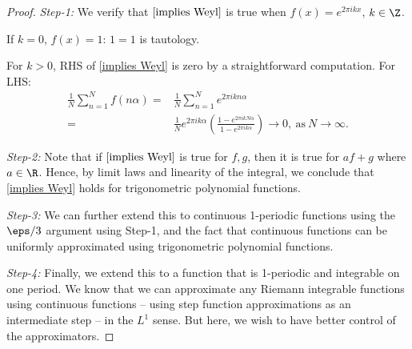 \begin{proof}
    \emph{Step-1:} We verify that \(\cref{implies Weyl}\) is true when \(f(x)=e^{2\pi ikx}\), \(k\in\Z\).

    \medskip

    If \(k=0\), \(f(x)=1\): \(1=1\) is tautology.

    \medskip

    For \(k>0\), RHS of \cref{implies Weyl} is zero by a straightforward computation. For LHS:
    \begin{align*} 
        \frac{1}{N}\sum_{n=1}^N f(n\alpha)=&\frac{1}{N}\sum_{n=1}^N e^{2\pi ikn\alpha}\\
        =&\frac{1}{N}e^{2\pi ik\alpha}\left(\frac{1-e^{2\pi ikN\alpha}}{1-e^{2\pi ik\alpha}}\right)\to 0,~\text{as}~N\to\infty.
    \end{align*}

    \medskip

    \emph{Step-2:} Note that if \(\cref{implies Weyl}\) is true for \(f,g\), then it is true for \(af+g\) where \(a\in\R\). Hence, by limit laws and linearity of the integral, we conclude that \cref{implies Weyl} holds for trigonometric polynomial functions.

    \medskip

    \emph{Step-3:} We can further extend this to continuous 1-periodic functions using the \(\eps/3\) argument using Step-1, and the fact that continuous functions can be uniformly approximated using trigonometric polynomial functions.

    \medskip

    \emph{Step-4:} Finally, we extend this to a function that is 1-periodic and integrable on one period. We know that we can approximate any Riemann integrable functions using continuous functions -- using step function approximations as an intermediate step -- in the \(L^1\) sense. But here, we wish to have better control of the approximators.

    \medskip


\end{proof}
